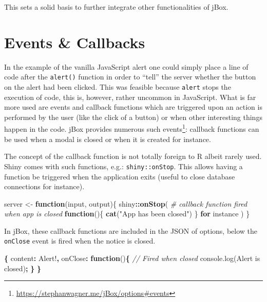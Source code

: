\documentclass[
]{krantz}
\makeatletter
\newenvironment{Shaded}{\begin{snugshade}}{\end{snugshade}}
\newcommand{\AttributeTok}[1]{\textcolor[rgb]{0.61,0.61,0.61}{#1}}
\newcommand{\CommentTok}[1]{\textcolor[rgb]{0.37,0.37,0.37}{\textit{#1}}}
\newcommand{\ControlFlowTok}[1]{\textcolor[rgb]{0.27,0.27,0.27}{\textbf{#1}}}
\newcommand{\DataTypeTok}[1]{\textcolor[rgb]{0.27,0.27,0.27}{#1}}
\newcommand{\KeywordTok}[1]{\textcolor[rgb]{0.27,0.27,0.27}{\textbf{#1}}}
\newcommand{\NormalTok}[1]{#1}
\newcommand{\OperatorTok}[1]{\textcolor[rgb]{0.43,0.43,0.43}{\textbf{#1}}}
\newcommand{\StringTok}[1]{\textcolor[rgb]{0.5,0.5,0.5}{#1}}
\newcommand{\VariableTok}[1]{\textcolor[rgb]{0,0,0}{#1}}
\renewcommand{\href}[2]{#2\footnote{\url{#1}}}
\newenvironment{kframe}{%
\medskip{}
\setlength{\fboxsep}{.8em}
 \def\at@end@of@kframe{}%
 \ifinner\ifhmode%
  \def\at@end@of@kframe{\end{minipage}}%
  \begin{minipage}{\columnwidth}%
 \fi\fi%
 \def\FrameCommand##1{\hskip\@totalleftmargin \hskip-\fboxsep
 \colorbox{shadecolor}{##1}\hskip-\fboxsep
     \hskip-\linewidth \hskip-\@totalleftmargin \hskip\columnwidth}%
 \MakeFramed {\advance\hsize-\width
   \@totalleftmargin\z@ \linewidth\hsize
   \@setminipage}}%
 {\par\unskip\endMakeFramed%
 \at@end@of@kframe}
\renewenvironment{Shaded}{\begin{kframe}}{\end{kframe}}
\makeatother
\begin{document}
This sets a solid basis to further integrate other functionalities of jBox.

\hypertarget{events-callbacks}{%
\section*{Events \& Callbacks}\label{events-callbacks}}


In the example of the vanilla JavaScript alert one could simply place a line of code after the \texttt{alert()} function in order to ``tell'' the server whether the button on the alert had been clicked. This was feasible because \texttt{alert} stops the execution of code, this is, however, rather uncommon in JavaScript. What is far more used are events and callback functions which are triggered upon an action is performed by the user (like the click of a button) or when other interesting things happen in the code. \href{https://stephanwagner.me/jBox/options\#events}{jBox provides numerous such events}: callback functions can be used when a modal is closed or when it is created for instance.

The concept of the callback function is not totally foreign to R albeit rarely used. Shiny comes with such functions, e.g.: \texttt{shiny::onStop}. This allows having a function be triggered when the application exits (useful to close database connections for instance).

\begin{Shaded}
\begin{Highlighting}[]
\NormalTok{server <{-}}\StringTok{ }\ControlFlowTok{function}\NormalTok{(input, output)\{}
\NormalTok{  shiny}\OperatorTok{::}\KeywordTok{onStop}\NormalTok{(}
    \CommentTok{\# callback function fired when app is closed}
    \ControlFlowTok{function}\NormalTok{()\{}
      \KeywordTok{cat}\NormalTok{(}\StringTok{"App has been closed"}\NormalTok{)}
\NormalTok{    \} }\ControlFlowTok{for}\NormalTok{ instance}
\NormalTok{  )}
\NormalTok{\}}
\end{Highlighting}
\end{Shaded}

In jBox, these callback functions are included in the JSON of options, below the \texttt{onClose} event is fired when the notice is closed.

\begin{Shaded}
\begin{Highlighting}[]
\OperatorTok{\{}
  \DataTypeTok{content}\OperatorTok{:} \StringTok{\textquotesingle{}Alert!\textquotesingle{}}\OperatorTok{,}
  \DataTypeTok{onClose}\OperatorTok{:} \KeywordTok{function}\NormalTok{()}\OperatorTok{\{}
    \CommentTok{// Fired when closed }
    \VariableTok{console}\NormalTok{.}\AttributeTok{log}\NormalTok{(}\StringTok{\textquotesingle{}Alert is closed\textquotesingle{}}\NormalTok{)}\OperatorTok{;}
  \OperatorTok{\}}
\OperatorTok{\}}
\end{Highlighting}
\end{Shaded}
\end{document}
